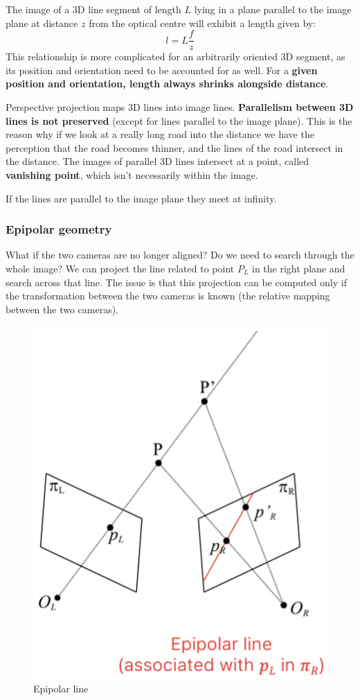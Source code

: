 The image of a 3D line segment of length $L$ lying in a plane parallel to the image plane at distance $z$ from the optical centre will exhibit a length given by:
$$l = L \frac{f}{z}$$
This relationship is more complicated for an arbitrarily oriented 3D segment, as its position and orientation need to be accounted for as well.
For a \textbf{given position and orientation, length always shrinks alongside distance}.

Perspective projection maps 3D lines into image lines.
\textbf{Parallelism between 3D lines is not preserved} (except for lines parallel to the image plane).
This is the reason why if we look at a really long road into the distance we have the perception that the road becomes thinner, and the lines of the road intersect in the distance.
The images of parallel 3D lines intersect at a point, called \textbf{vanishing point}, which isn't necessarily within the image.

If the lines are parallel to the image plane they meet at infinity.

\subsubsection{Epipolar geometry}

What if the two cameras are no longer aligned? Do we need to search through the whole image?
We can project the line related to point $P_L$ in the right plane and search across that line.
The issue is that this projection can be computed only if the transformation between the two cameras is known (the relative mapping between the two cameras).

\begin{figure}[htbp]
  \centering
  \includegraphics[width=0.45\linewidth]{./img/epipolar_line.jpg}
  \caption{Epipolar line}
  \label{fig:epipolar_line}
\end{figure}

